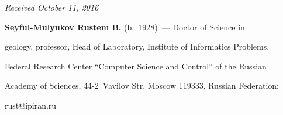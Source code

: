 \vspace*{-6pt}



\hfill{\small\textit{Received October 11, 2016}}



\vspace*{-24pt}



\Contrl





\vspace*{3pt}



\noindent

\textbf{Seyful-Mulyukov Rustem B.} (b.\ 1928)~--- Doctor of Science in 

geology, professor, Head of Laboratory, Institute of Informatics Problems, 

Federal Research Center ``Computer Science and Control'' of the Russian 

Academy of Sciences, 44-2~Vavilov Str,  Moscow 119333, Russian Federation; 

\mbox{rust@ipiran.ru}

















\newpage



\vspace*{-24pt}







\def\tit{ИНФОРМАТИКА И~ЕЕ РОЛЬ В~ПОЗНАНИИ 

ОБРАЗОВАНИЯ И~СВОЙСТВ СЛОЖНОЙ ПРИРОДНОЙ 

СИСТЕМЫ}



\def\aut{Р.\,Б.~Сейфуль-Мулюков}





\def\titkol{Информатика и~ее роль в~познании 

образования и~свойств сложной природной 

системы}



